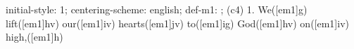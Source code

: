 initial-style: 1;
centering-scheme: english;
def-m1: \grealign;
(c4) 1. We([em1]g) lift([em1]hv) our([em1]iv) hearts([em1]jv) to([em1]ig) God([em1]hv) on([em1]iv) high,([em1]h)
